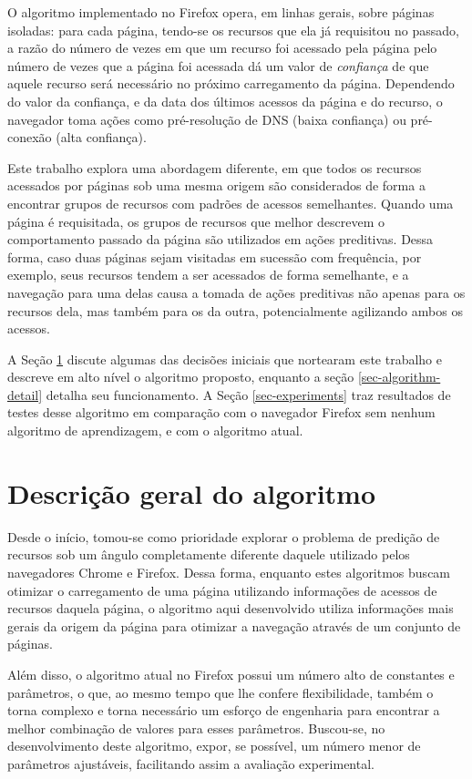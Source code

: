 \documentclass[10pt,twocolumn,letterpaper]{article}
\begin{document}
O algoritmo implementado no Firefox opera, em linhas gerais, sobre páginas isoladas: para cada página, tendo-se os recursos que ela já requisitou no passado, a razão do número de vezes em que um recurso foi acessado pela página pelo número de vezes que a página foi acessada dá um valor de \emph{confiança} de que aquele recurso será necessário no próximo carregamento da página. Dependendo do valor da confiança, e da data dos últimos acessos da página e do recurso, o navegador toma ações como pré-resolução de DNS  (baixa confiança) ou pré-conexão (alta confiança).

Este trabalho explora uma abordagem diferente, em que todos os recursos acessados por páginas sob uma mesma origem são considerados de forma a encontrar grupos de recursos com padrões de acessos semelhantes. Quando uma página é requisitada, os grupos de recursos que melhor descrevem o comportamento passado da página são utilizados em ações preditivas. Dessa forma, caso duas páginas sejam visitadas em sucessão com frequência, por exemplo, seus recursos tendem a ser acessados de forma semelhante, e a navegação para uma delas causa a tomada de ações preditivas não apenas para os recursos dela, mas também para os da outra, potencialmente agilizando ambos os acessos.

A Seção \ref{sec-algorithm-highlevel} discute algumas das decisões iniciais que nortearam este trabalho e descreve em alto nível o algoritmo proposto, enquanto a seção \ref{sec-algorithm-detail} detalha seu funcionamento. A Seção \ref{sec-experiments} traz resultados de testes desse algoritmo em comparação com o navegador Firefox sem nenhum algoritmo de aprendizagem, e com o algoritmo atual.

\section{Descrição geral do algoritmo}
\label{sec-algorithm-highlevel}

Desde o início, tomou-se como prioridade explorar o problema de predição de recursos sob um ângulo completamente diferente daquele utilizado pelos navegadores Chrome e Firefox. Dessa forma, enquanto estes algoritmos buscam otimizar o carregamento de uma página utilizando informações de acessos de recursos daquela página, o algoritmo aqui desenvolvido utiliza informações mais gerais da origem da página para otimizar a navegação através de um conjunto de páginas.

Além disso, o algoritmo atual no Firefox possui um número alto de constantes e parâmetros, o que, ao mesmo tempo que lhe confere flexibilidade, também o torna complexo e torna necessário um esforço de engenharia para encontrar a melhor combinação de valores para esses parâmetros. Buscou-se, no desenvolvimento deste algoritmo, expor, se possível, um número menor de parâmetros ajustáveis, facilitando assim a avaliação experimental.
\end{document}
